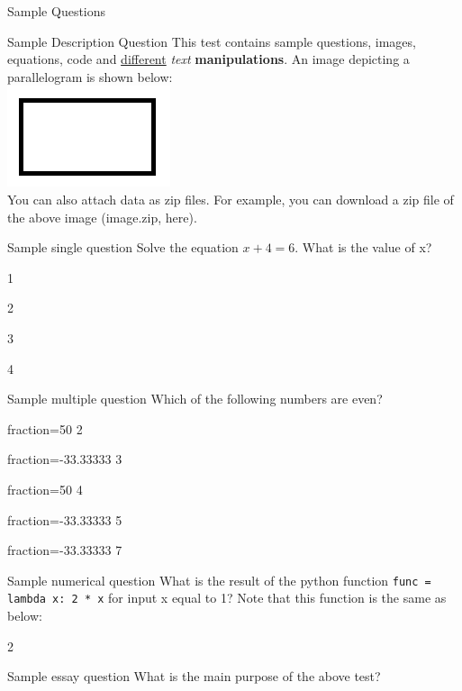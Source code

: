\documentclass[12pt]{article}
\begin{document}
\begin{quiz}{Sample Questions}

\begin{description}{Sample Description Question}
This test contains sample questions, images, equations, code and \underline{different} \textit{text} \textbf{manipulations}. An image depicting a parallelogram is shown below:\\
\includegraphics{image.png}\\
You can also attach data as zip files. For example, you can download a zip file of the above image ({{image.zip, here}}).
\end{description}

\begin{singlechoice}{Sample single question}
Solve the equation ${x + 4 = 6}$. What is the value of x?
\item 1
\item* 2
\item 3
\item 4
\end{singlechoice}

\begin{multichoice}{Sample multiple question}
Which of the following numbers are even?
\item[fraction=50] 2
\item[fraction=-33.33333] 3
\item[fraction=50] 4
\item[fraction=-33.33333] 5
\item[fraction=-33.33333] 7
\end{multichoice}

\begin{numerical}{Sample numerical question}
What is the result of the python function \texttt{func = lambda x: 2 * x} for input x equal to 1? Note that this function is the same as below:

\item 2
\end{numerical}

\begin{essay}{Sample essay question}
What is the main purpose of the above test?
\end{essay}

\end{quiz}
\end{document}
